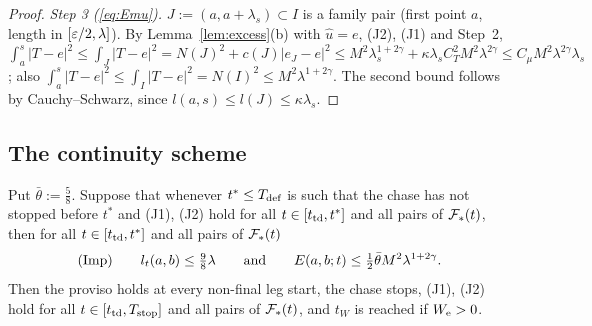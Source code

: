 \begin{proof}
\emph{Step 3 (\eqref{eq:Emu}).} $J:=(a,a+\lambda_s)\subset I$ is a family pair (first point $a$, length in
$[\varepsilon/2,\lambda]$). By Lemma~\ref{lem:excess}(b) with $\hat u=e$, (J2), (J1) and Step~2,
$\int_a^s|T-e|^2\le\int_J|T-e|^2=N(J)^2+c(J)|e_J-e|^2\le M^2\lambda_s^{1+2\gamma}+\kappa\lambda_sC_T^2M^2\lambda^{2\gamma}
\le C_\mu M^2\lambda^{2\gamma}\lambda_s$; also $\int_a^s|T-e|^2\le\int_I|T-e|^2=N(I)^2\le M^2\lambda^{1+2\gamma}$. The
second bound follows by Cauchy--Schwarz, since $l(a,s)\le l(J)\le\kappa\lambda_s$.
\end{proof}

\subsection{The continuity scheme}\label{app:walk:cont}

\begin{lemma}\label{lem:cont}
Put $\bar\theta:=\frac58$. Suppose that whenever $t^*\le T_{\mathrm{def}}$ is such that the chase has not stopped before $t^*$ and
\textup{(J1)}, \textup{(J2)} hold for all $t\in[t_{\mathrm{td}},t^*]$ and all pairs of $\mathcal{F}_*(t)$, then for all
$t\in[t_{\mathrm{td}},t^*]$ and all pairs of $\mathcal{F}_*(t)$
\begin{equation}\label{eq:Imp}
\textup{(Imp)}\qquad l_t(a,b)\le\tfrac98\lambda\qquad\text{and}\qquad E(a,b;t)\le\tfrac12\bar\theta M^2\lambda^{1+2\gamma}.
\end{equation}
Then the proviso holds at every non-final leg start, the chase stops, \textup{(J1)}, \textup{(J2)} hold for all
$t\in[t_{\mathrm{td}},T_{\mathrm{stop}}]$ and all pairs of $\mathcal{F}_*(t)$, and $t_W$ is reached if $W_{\mathrm{e}}>0$.
\end{lemma}

